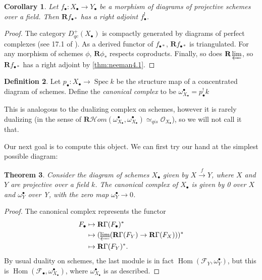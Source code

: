 \documentclass[proquest]{uwthesis}[2014/11/13]
\newtheorem{theorem}{Theorem}[section]
\newtheorem{cor}[theorem]{Corollary}
\theoremstyle{definition}
\newtheorem{definition}[theorem]{Definition}
\DeclareMathOperator{\Hom}{Hom}
\newcommand{\cHom}{\mathcal{H} \textit{om}}
\DeclareMathOperator{\Spec}{Spec}
\newcommand{\FF}{\mathscr{F}}
\newcommand{\OO}{\mathcal{O}}
\newcommand{\qis}{\simeq_{qis}}
\newcommand{\bR}{\textbf{R}}
\begin{document}
\begin{cor}
	Let $f_\bullet : X_\bullet \rightarrow Y_\bullet$ be a morphism of diagrams of projective schemes over a field.
	Then $\bR f_{\bullet *}$ has a right adjoint $f^!_\bullet$.
\end{cor}
\begin{proof}
	The category $D_{qc}^+(X_\bullet)$ is compactly generated by diagrams of perfect complexes (see 17.1 of \cite{Lipman2009}).
	As a derived functor of $f_{\bullet *}$, $\bR f_{\bullet *}$ is triangulated.
	For any morphism of schemes $\phi$, $\bR \phi_*$ respects coproducts.
	Finally, so does $\bR \varprojlim$, so $\bR f_{\bullet *}$ has a right adjoint by \ref{thm:neeman4.1}.
\end{proof}

\begin{definition}
	Let $p_\bullet : X_\bullet \rightarrow \Spec k$ be the structure map of a concentrated diagram of schemes.
	Define the \textit{canonical complex} to be $\omega_{X_\bullet}^\bullet = p_\bullet^! k$
\end{definition}

This is analogous to the dualizing complex on schemes, however it is rarely dualizing (in the sense of $\bR \cHom(\omega_{X_\bullet}^\bullet, \omega_{X_\bullet}^\bullet) \qis \OO_{X_\bullet}$), so we will not call it that.

Our next goal is to compute this object.
We can first try our hand at the simplest possible diagram:
\begin{theorem}
	Consider the diagram of schemes $X_\bullet$ given by $X \xrightarrow{f} Y$, where $X$ and $Y$ are projective over a field $k$.
	The canonical complex of $X_\bullet$ is given by 0 over $X$ and $\omega^\bullet_Y$ over Y, with the zero map $\omega^\bullet_Y \rightarrow 0$.
\end{theorem}
\begin{proof}
	The canonical complex represents the functor
	\begin{align*}
	F_\bullet &\mapsto \bR \Gamma (F_\bullet)^* \\
	&\mapsto (\varprojlim (\bR \Gamma (F_Y) \rightarrow \bR \Gamma (F_X)))^* \\
	&\mapsto \bR \Gamma (F_Y)^*.
	\end{align*}
	By usual duality on schemes, the last module is in fact $\Hom(\FF_Y, \omega_Y^\bullet)$, but this is $\Hom(\FF_\bullet, \omega^\bullet_{X_\bullet})$, where $\omega^\bullet_{X_\bullet}$ is as described.
\end{proof}
\end{document}

